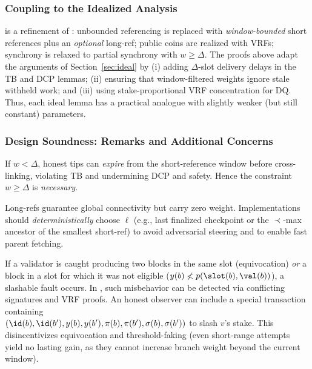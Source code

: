 \subsubsection{Coupling to the Idealized Analysis}
\label{subsec:base-coupling}
\ProjBase is a refinement of \ProjIdeal: unbounded referencing is replaced with \emph{window-bounded} short references plus an \emph{optional} long-ref; public coins are realized with VRFs; synchrony is relaxed to partial synchrony with $w\ge \Delta$. The proofs above adapt the arguments of Section~\ref{sec:ideal} by (i) adding $\Delta$-slot delivery delays in the TB and DCP lemmas; (ii) ensuring that window-filtered weights ignore stale withheld work; and (iii) using stake-proportional VRF concentration for DQ. Thus, each ideal lemma has a practical analogue with slightly weaker (but still constant) parameters.

\subsubsection{Design Soundness: Remarks and Additional Concerns}
\label{subsec:base-remarks}
\begin{remark}
If $w<\Delta$, honest tips can \emph{expire} from the short-reference window before cross-linking, violating TB and undermining DCP and safety. Hence the constraint $w\ge \Delta$ is \emph{necessary}.
\end{remark}

\begin{remark}
Long-refs guarantee global connectivity but carry zero weight. Implementations should \emph{deterministically} choose $\ell$ (e.g., last finalized checkpoint or the $\prec$-max ancestor of the smallest short-ref) to avoid adversarial steering and to enable fast parent fetching.
\end{remark}

\begin{remark}
If a validator is caught producing two blocks in the same slot (equivocation) \emph{or} a block in a slot for which it was not eligible ($y(b)\not< p(\slot(b),\val(b))$), a slashable fault occurs. In \ProjBase, such misbehavior can be detected via conflicting signatures and VRF proofs. An honest observer can include a special transaction containing \\
$(\id(b),\id(b'),y(b),y(b'),\pi(b),\pi(b'),\sigma(b),\sigma(b'))$ to slash $v$'s stake. This disincentivizes equivocation and threshold-faking (even short-range attempts yield no lasting gain, as they cannot increase branch weight beyond the current window).
\end{remark}

